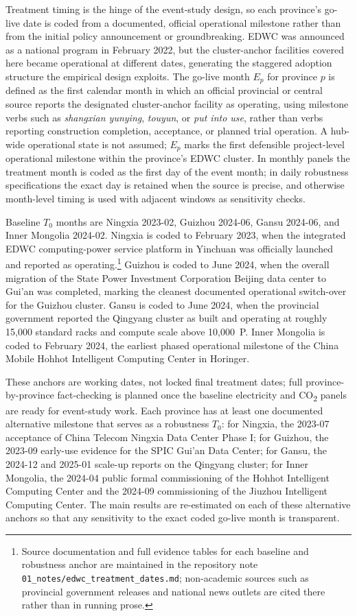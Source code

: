 \documentclass[12pt,a4paper]{article}
\begin{document}
Treatment timing is the hinge of the event-study design, so each
province's go-live date is coded from a documented, official
operational milestone rather than from the initial policy
announcement or groundbreaking. EDWC was announced as a national
program in February 2022, but the cluster-anchor facilities covered
here became operational at different dates, generating the staggered
adoption structure the empirical design exploits. The go-live month
$E_p$ for province $p$ is defined as the first calendar month in
which an official provincial or central source reports the
designated cluster-anchor facility as operating, using milestone
verbs such as \textit{shangxian yunying}, \textit{touyun}, or
\textit{put into use}, rather than verbs reporting construction
completion, acceptance, or planned trial operation. A hub-wide
operational state is not assumed; $E_p$ marks the first defensible
project-level operational milestone within the province's EDWC
cluster. In monthly panels the treatment month is coded as the first
day of the event month; in daily robustness specifications the exact
day is retained when the source is precise, and otherwise
month-level timing is used with adjacent windows as sensitivity
checks.

Baseline $T_0$ months are Ningxia 2023-02, Guizhou 2024-06, Gansu
2024-06, and Inner Mongolia 2024-02. Ningxia is coded to February
2023, when the integrated EDWC computing-power service platform in
Yinchuan was officially launched and reported as operating.\footnote{Source
documentation and full evidence tables for each baseline and
robustness anchor are maintained in the repository note
\texttt{01\_notes/edwc\_treatment\_dates.md}; non-academic sources
such as provincial government releases and national news outlets are
cited there rather than in running prose.} Guizhou is coded to June
2024, when the overall migration of the State Power Investment
Corporation Beijing data center to Gui'an was completed, marking the
cleanest documented operational switch-over for the Guizhou cluster.
Gansu is coded to June 2024, when the provincial government reported
the Qingyang cluster as built and operating at roughly 15{,}000
standard racks and compute scale above 10{,}000~P. Inner Mongolia is
coded to February 2024, the earliest phased operational milestone of
the China Mobile Hohhot Intelligent Computing Center in Horinger.

These anchors are working dates, not locked final treatment dates;
full province-by-province fact-checking is planned once the baseline
electricity and CO\textsubscript{2} panels are ready for event-study
work. Each province has at least one documented alternative milestone
that serves as a robustness $T_0$: for Ningxia, the 2023-07
acceptance of China Telecom Ningxia Data Center Phase I; for
Guizhou, the 2023-09 early-use evidence for the SPIC Gui'an Data
Center; for Gansu, the 2024-12 and 2025-01 scale-up reports on the
Qingyang cluster; for Inner Mongolia, the 2024-04 public formal
commissioning of the Hohhot Intelligent Computing Center and the
2024-09 commissioning of the Jiuzhou Intelligent Computing Center.
The main results are re-estimated on each of these alternative
anchors so that any sensitivity to the exact coded go-live month is
transparent.
\end{document}
